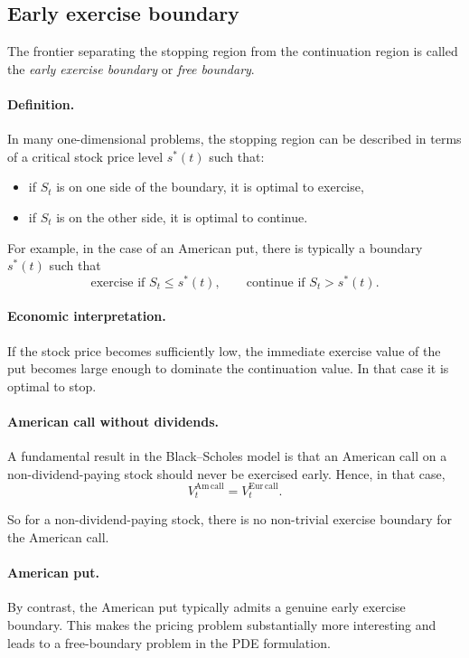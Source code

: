 \documentclass[11pt]{article}
\theoremstyle{definition}
\theoremstyle{plain}
\begin{document}
\subsection{Early exercise boundary}

The frontier separating the stopping region from the continuation region
is called the \emph{early exercise boundary} or \emph{free boundary}.

\paragraph{Definition.}
In many one-dimensional problems, the stopping region can be described
in terms of a critical stock price level \(s^*(t)\) such that:
\begin{itemize}[leftmargin=1.4em]
    \item if \(S_t\) is on one side of the boundary, it is optimal to exercise,
    \item if \(S_t\) is on the other side, it is optimal to continue.
\end{itemize}

For example, in the case of an American put, there is typically a boundary
\(s^*(t)\) such that
\[
\text{exercise if } S_t \le s^*(t),
\qquad
\text{continue if } S_t > s^*(t).
\]

\paragraph{Economic interpretation.}
If the stock price becomes sufficiently low, the immediate exercise value
of the put becomes large enough to dominate the continuation value.
In that case it is optimal to stop.

\paragraph{American call without dividends.}
A fundamental result in the Black--Scholes model is that an American call
on a non-dividend-paying stock should never be exercised early.
Hence, in that case,
\[
V_t^{\mathrm{Am\,call}} = V_t^{\mathrm{Eur\,call}}.
\]

So for a non-dividend-paying stock, there is no non-trivial exercise
boundary for the American call.

\paragraph{American put.}
By contrast, the American put typically admits a genuine early exercise
boundary.
This makes the pricing problem substantially more interesting and leads
to a free-boundary problem in the PDE formulation.
\end{document}
